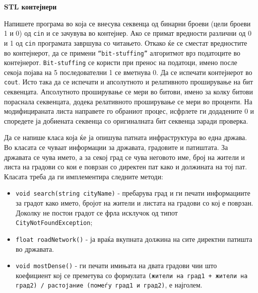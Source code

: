 \documentclass[12pt,a4paper]{exam}
\begin{document}
\pagestyle{headandfoot}
\headrule
{}
\begin{center}
\Large{\textbf{STL контејнери}}
\end{center}
\begin{questions}

\question
Напишете програма во која се внесува секвенца од бинарни броеви (цели броеви 1 и
0) од \texttt{cin} и се зачувува во контејнер. Ако се примат вредности различни
од 0 и 1 од \texttt{cin} програмата завршува со читањето. Откако ќе се сместат
вредностите во контејнерот, да се примени \texttt{``bit-stuffing''} алгоритмот
врз податоците во контејнерот. \texttt{Bit-stuffing} се користи при пренос на
податоци, имено после секоја појава на 5 последователни 1 се вметнува 0. Да се
испечати контејнерот во \texttt{cout}. Исто така да се испечати и апсолутното и
релативното проширување на бит секвенцата. Апсолутното проширување се мери во
битови, имено за колку битови пораснала секвенцата, додека релативното
проширување се мери во проценти. На модифицираната листа направете го обраниот
процес, исфрлете ги додадените 0 и споредете ја добиената секвенца со
оригиналната бит секвенца заради проверка.

\question
Да се напише класа која ќе ја опишува патната инфраструктура во една држава. Во класата се
чуваат информации за државата, градовите и патиштата. За државата се чува името,
а за секој град се чува неговото име, број на жители и листа на градови со кои е
поврзан со директен пат како и должината на тој пат.
Класата треба да ги имплементира следните методи:
\begin{itemize}
  \item \texttt{void search(string cityName)} - пребарува град и ги печати информациите
  за градот како името, бројот на жители и листата на градови со кој е поврзан. Доколку не
постои градот се фрла исклучок од типот \texttt{CityNotFoundException};
\item \texttt{float roadNetwork()} - ја враќа вкупната должина на сите директни патишта во
државата.
\item \texttt{void mostDense()} - ги печати имињата на двата градови чии што коефициент кој се
преметува со формулата \texttt{(жители на град1 + жители на град2) / растојание (помеѓу град1 и
град2)}, е најголем.  
\end{itemize}

\end{questions}
\end{document}
